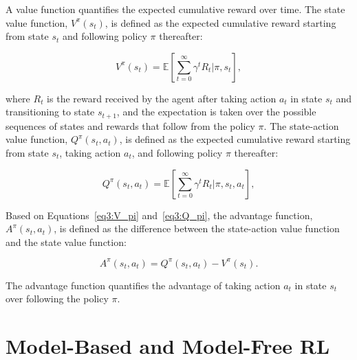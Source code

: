 A value function quantifies the expected cumulative reward over time.
The state value function, $V^{\pi}(s_t)$, is defined as the expected cumulative reward starting from state $s_t$ and following policy $\pi$ thereafter:

\begin{equation} \label{eq3:V_pi}
    V^{\pi}(s_t) = \mathbb{E} \left[ \sum_{t=0}^{\infty} \gamma^t R_t |\pi, s_t \right],
\end{equation}

where $R_t$ is the reward received by the agent after taking action $a_t$ in state $s_t$ and transitioning to state $s_{t+1}$, and the expectation is taken over the possible sequences of states and rewards that follow from the policy $\pi$.
The state-action value function, $Q^{\pi}(s_t, a_t)$, is defined as the expected cumulative reward starting from state $s_t$, taking action $a_t$, and following policy $\pi$ thereafter:

\begin{equation} \label{eq3:Q_pi}
    Q^{\pi}(s_t, a_t) = \mathbb{E} \left[ \sum_{t=0}^{\infty} \gamma^t R_t |\pi, s_t, a_t \right],
\end{equation}

Based on Equations~\ref{eq3:V_pi} and~\ref{eq3:Q_pi}, the advantage function, $A^{\pi}(s_t, a_t)$, is defined as the difference between the state-action value function and the state value function:

\begin{equation} \label{eq3:A_pi}
    A^{\pi}(s_t, a_t) = Q^{\pi}(s_t, a_t) - V^{\pi}(s_t).
\end{equation}

The advantage function quantifies the advantage of taking action $a_t$ in state $s_t$ over following the policy $\pi$.

\section{Model-Based and Model-Free RL}

